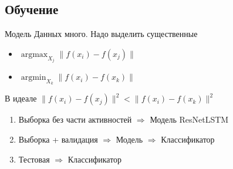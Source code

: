 \documentclass[unicode]{beamer}
\newcommand\argmin{\mathop{\arg\min}}
\newcommand\argmax{\mathop{\arg\max}}
\begin{document}
\subsection{Обучение}
\begin{frame}{Модель}
    Данных много. Надо выделить существенные
    \begin{itemize}
        \item $\argmax_{X_j} \| f(x_i) - f(x_j)\|$
        \item $\argmin_{X_k} \| f(x_i) - f(x_k)\|$
    \end{itemize}
    В идеале $\| f(x_i) - f(x_j)\|^2 < \| f(x_i) - f(x_k)\|^2$
        \begin{enumerate}
        \item Выборка без части активностей $\Rightarrow$ Модель ResNetLSTM
        \item Выборка + валидация $\Rightarrow$ Модель $\Rightarrow$ Классификатор
        \item Тестовая $\Rightarrow$ Классификатор
    \end{enumerate}
    \vspace*{-15pt}\begin{figure}
         \begin{centering}
        \end{centering}
    \end{figure}
\end{frame}
\end{document}

